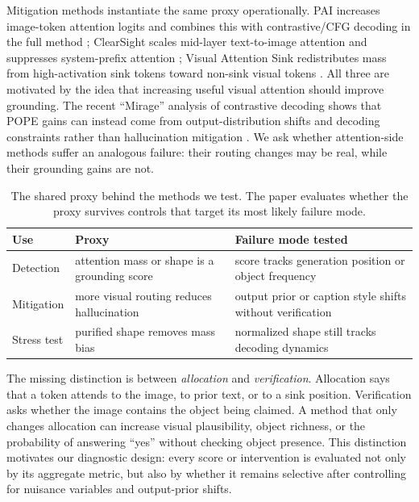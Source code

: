 \documentclass[letterpaper]{article} \usepackage[submission]{aaai2027}  \usepackage[hyphens]{url}  \usepackage{graphicx} \urlstyle{rm} \def\UrlFont{\rm}  \usepackage{natbib}  \usepackage{caption} \frenchspacing
\begin{document}
Mitigation methods instantiate the same proxy operationally. PAI increases image-token attention logits and combines this with contrastive/CFG decoding in the full method \cite{liu2024pai}; ClearSight scales mid-layer text-to-image attention and suppresses system-prefix attention \cite{yin2025clearsight}; Visual Attention Sink redistributes mass from high-activation sink tokens toward non-sink visual tokens \cite{kang2025visualsink}. All three are motivated by the idea that increasing useful visual attention should improve grounding. The recent ``Mirage'' analysis of contrastive decoding shows that POPE gains can instead come from output-distribution shifts and decoding constraints rather than hallucination mitigation \cite{yin2025mirage}. We ask whether attention-side methods suffer an analogous failure: their routing changes may be real, while their grounding gains are not.

\begin{table}[t]
\centering
\scriptsize
\setlength{\tabcolsep}{3.0pt}
\begin{tabular}{p{}p{}p{}}
\toprule
Use & Proxy & Failure mode tested \\
\midrule
Detection & attention mass or shape is a grounding score & score tracks generation position or object frequency \\
Mitigation & more visual routing reduces hallucination & output prior or caption style shifts without verification \\
Stress test & purified shape removes mass bias & normalized shape still tracks decoding dynamics \\
\bottomrule
\end{tabular}
\caption{The shared proxy behind the methods we test. The paper evaluates whether the proxy survives controls that target its most likely failure mode.}
\label{tab:proxy}
\end{table}
 

The missing distinction is between \emph{allocation} and \emph{verification}. Allocation says that a token attends to the image, to prior text, or to a sink position. Verification asks whether the image contains the object being claimed. A method that only changes allocation can increase visual plausibility, object richness, or the probability of answering ``yes'' without checking object presence. This distinction motivates our diagnostic design: every score or intervention is evaluated not only by its aggregate metric, but also by whether it remains selective after controlling for nuisance variables and output-prior shifts.
\end{document}
